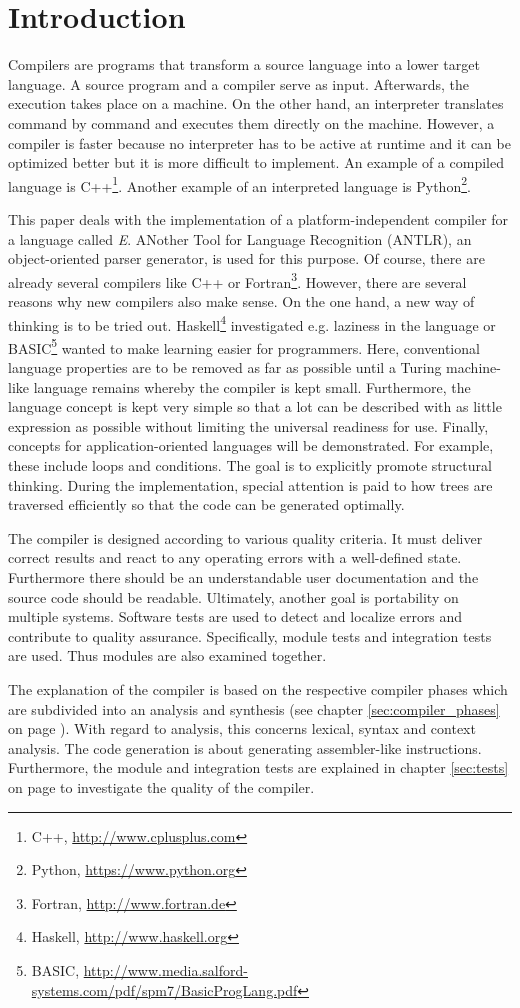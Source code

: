 \section{Introduction}
\label{sec:introduction}
Compilers are programs that transform a source language into a lower target language. A source program and a compiler serve as input. Afterwards, the execution takes place on a machine. On the other hand, an interpreter translates command by command and executes them directly on the machine. However, a compiler is faster because no interpreter has to be active at runtime and it can be optimized better but it is more difficult to implement. An example of a compiled language is C++\footnote{C++, \url{http://www.cplusplus.com}}. Another example of an interpreted language is Python\footnote{Python, \url{https://www.python.org}}.

This paper deals with the implementation of a platform-independent compiler for a language called \emph{E}. ANother Tool for Language Recognition (ANTLR), an object-oriented parser generator, is used for this purpose. Of course, there are already several compilers like C++ or Fortran\footnote{Fortran, \url{http://www.fortran.de}}. However, there are several reasons why new compilers also make sense. On the one hand, a new way of thinking is to be tried out. Haskell\footnote{Haskell, \url{http://www.haskell.org}} investigated e.g. laziness in the language or BASIC\footnote{BASIC, \url{http://www.media.salford-systems.com/pdf/spm7/BasicProgLang.pdf}} wanted to make learning easier for programmers. Here, conventional language properties are to be removed as far as possible until a Turing machine-like language remains whereby the compiler is kept small. Furthermore, the language concept is kept very simple so that a lot can be described with as little expression as possible without limiting the universal readiness for use. Finally, concepts for application-oriented languages will be demonstrated. For example, these include loops and conditions. The goal is to explicitly promote structural thinking. During the implementation, special attention is paid to how trees are traversed efficiently so that the code can be generated optimally.

The compiler is designed according to various quality criteria. It must deliver correct results and react to any operating errors with a well-defined state. Furthermore there should be an understandable user documentation and the source code should be readable. Ultimately, another goal is portability on multiple systems. Software tests are used to detect and localize errors and contribute to quality assurance. Specifically, module tests and integration tests are used. Thus modules are also examined together.

The explanation of the compiler is based on the respective compiler phases which are subdivided into an analysis and synthesis (see chapter \ref{sec:compiler_phases} on page \pageref{sec:compiler_phases}). With regard to analysis, this concerns lexical, syntax and context analysis. The code generation is about generating assembler-like instructions. Furthermore, the module and integration tests are explained in chapter \ref{sec:tests} on page \pageref{sec:tests} to investigate the quality of the compiler.